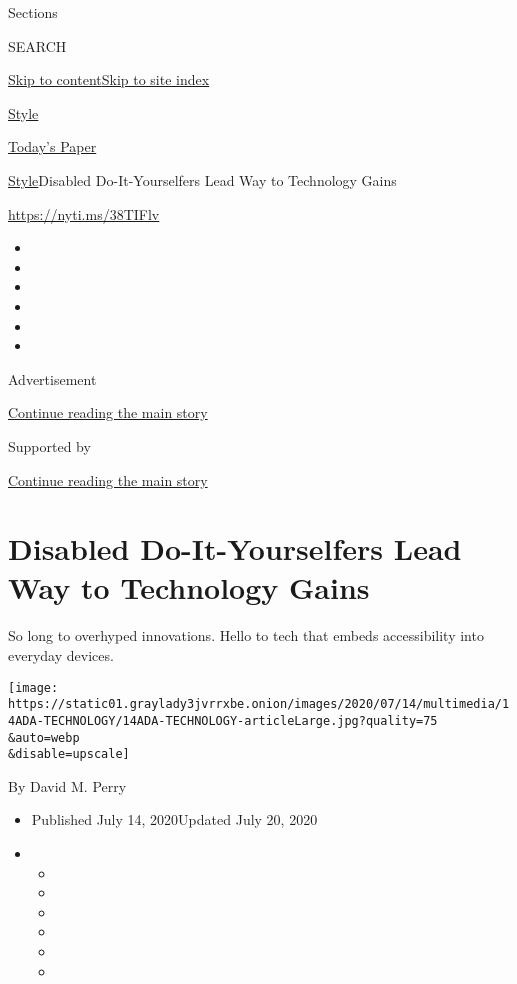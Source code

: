 Sections

SEARCH

\protect\hyperlink{site-content}{Skip to
content}\protect\hyperlink{site-index}{Skip to site index}

\href{https://www.nytimes3xbfgragh.onion/section/style}{Style}

\href{https://myaccount.nytimes3xbfgragh.onion/auth/login?response_type=cookie\&client_id=vi}{}

\href{https://www.nytimes3xbfgragh.onion/section/todayspaper}{Today's
Paper}

\href{/section/style}{Style}\textbar{}Disabled Do-It-Yourselfers Lead
Way to Technology Gains

\url{https://nyti.ms/38TIFlv}

\begin{itemize}
\item
\item
\item
\item
\item
\item
\end{itemize}

Advertisement

\protect\hyperlink{after-top}{Continue reading the main story}

Supported by

\protect\hyperlink{after-sponsor}{Continue reading the main story}

\hypertarget{disabled-do-it-yourselfers-lead-way-to-technology-gains}{%
\section{Disabled Do-It-Yourselfers Lead Way to Technology
Gains}\label{disabled-do-it-yourselfers-lead-way-to-technology-gains}}

So long to overhyped innovations. Hello to tech that embeds
accessibility into everyday devices.

\texttt{[image: https://static01.graylady3jvrrxbe.onion/images/2020/07/14/multimedia/14ADA-TECHNOLOGY/14ADA-TECHNOLOGY-articleLarge.jpg?quality=75\\\&auto=webp\\\&disable=upscale]}

By David M. Perry

\begin{itemize}
\item
  Published July 14, 2020Updated July 20, 2020
\item
  \begin{itemize}
  \item
  \item
  \item
  \item
  \item
  \item
  \end{itemize}
\end{itemize}

